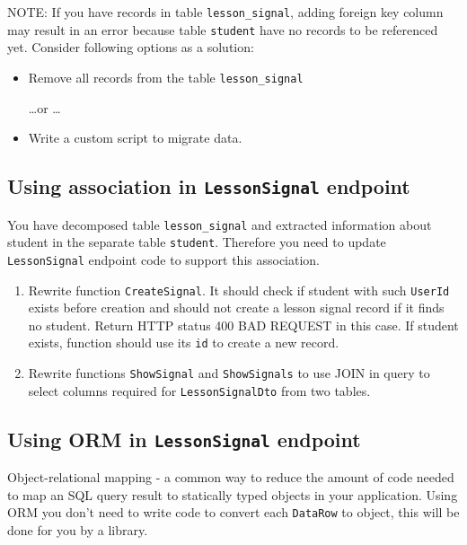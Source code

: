 \documentclass[12pt]{article}
\newcommand{\code}[1]{\texttt{#1}}
\begin{document}
NOTE: If you have records in table \code{lesson\_signal}, adding foreign key column may result in an error because table \code{student} have no records to be referenced yet. Consider following options as a solution:

\begin{itemize}

\item Remove all records from the table \code{lesson\_signal}

\dots or \dots

\item Write a custom script to migrate data.

\end{itemize}

\subsection*{Using association in \code{LessonSignal} endpoint}

You have decomposed table \code{lesson\_signal} and extracted information about student in the separate table \code{student}. Therefore you need to update \code{LessonSignal} endpoint code to support  this association.

\begin{enumerate}
\item Rewrite function \code{CreateSignal}. It should check if student with such \code{UserId} exists before creation and should not create a lesson signal record if it finds no student. Return HTTP status 400 BAD REQUEST in this case. If student exists, function should use its \code{id} to create a new record.
\item Rewrite functions \code{ShowSignal} and \code{ShowSignals} to use JOIN in query to select columns required for \code{LessonSignalDto} from two tables.
\end{enumerate}

\subsection*{Using ORM in \code{LessonSignal} endpoint}

Object-relational mapping - a common way to reduce the amount of code needed to map an SQL query result to statically typed objects in your application. Using ORM you don't need to write code to convert each \code{DataRow} to object, this will be done for you by a library.
\end{document}
